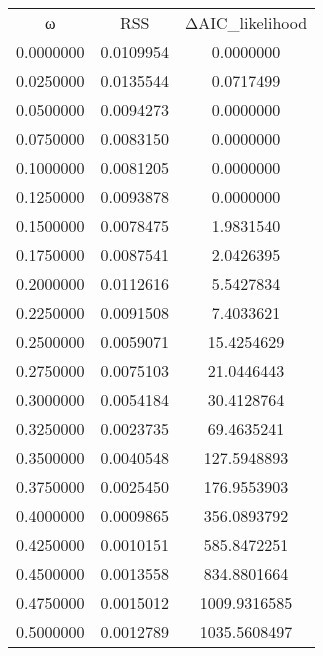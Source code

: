 \begin{tabular}{ccc}
ω & RSS & ΔAIC_likelihood\\
0.0000000 & 0.0109954 & 0.0000000\\
0.0250000 & 0.0135544 & 0.0717499\\
0.0500000 & 0.0094273 & 0.0000000\\
0.0750000 & 0.0083150 & 0.0000000\\
0.1000000 & 0.0081205 & 0.0000000\\
0.1250000 & 0.0093878 & 0.0000000\\
0.1500000 & 0.0078475 & 1.9831540\\
0.1750000 & 0.0087541 & 2.0426395\\
0.2000000 & 0.0112616 & 5.5427834\\
0.2250000 & 0.0091508 & 7.4033621\\
0.2500000 & 0.0059071 & 15.4254629\\
0.2750000 & 0.0075103 & 21.0446443\\
0.3000000 & 0.0054184 & 30.4128764\\
0.3250000 & 0.0023735 & 69.4635241\\
0.3500000 & 0.0040548 & 127.5948893\\
0.3750000 & 0.0025450 & 176.9553903\\
0.4000000 & 0.0009865 & 356.0893792\\
0.4250000 & 0.0010151 & 585.8472251\\
0.4500000 & 0.0013558 & 834.8801664\\
0.4750000 & 0.0015012 & 1009.9316585\\
0.5000000 & 0.0012789 & 1035.5608497\\
\end{tabular}
